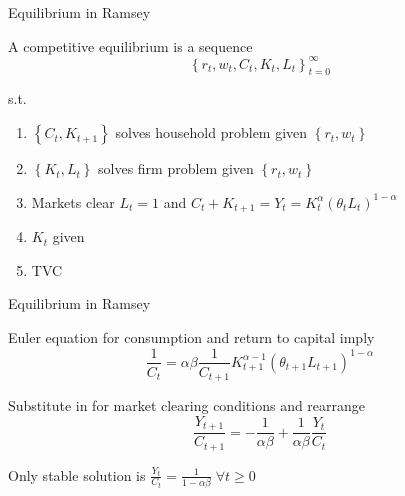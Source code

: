 
\begin{frame}{Equilibrium in Ramsey}

A competitive equilibrium is a sequence 
\begin{equation*}
\left\{ r_{t},w_{t},C_{t},K_{t},L_{t}\right\} _{t=0}^{\infty }
\end{equation*}

s.t.

\begin{enumerate}
\item $\left\{ C_{t},K_{t+1}\right\} $ solves household problem given $\left\{ r_{t},w_{t}\right\} $
\item $\left\{ K_{t},L_{t}\right\} $ solves firm problem given $\left\{r_{t},w_{t}\right\} $
\item Markets clear $L_{t}=1$ and $C_{t}+K_{t+1}=Y_{t}=K_{t}^{\alpha }\left(\theta _{t}L_{t}\right) ^{1-\alpha }$
\item $K_{t}$ given
\item TVC
\end{enumerate}

\end{frame}


\begin{frame}{Equilibrium in Ramsey}

Euler equation for consumption and return to capital imply
\begin{equation*}
\frac{1}{C_{t}}=\alpha \beta \frac{1}{C_{t+1}}K_{t+1}^{\alpha -1}\left(\theta _{t+1}L_{t+1}\right) ^{1-\alpha }
\end{equation*}

Substitute in for market clearing conditions and rearrange
\begin{equation*}
\frac{Y_{t+1}}{C_{t+1}}=-\frac{1}{\alpha \beta }+\frac{1}{\alpha \beta } \frac{Y_{t}}{C_{t}}
\end{equation*}

\vspace{2mm}
Only stable solution is $\frac{Y_{t}}{C_{t}} = \frac{1}{1-\alpha \beta} \; \forall t\geq 0$

\end{frame}


